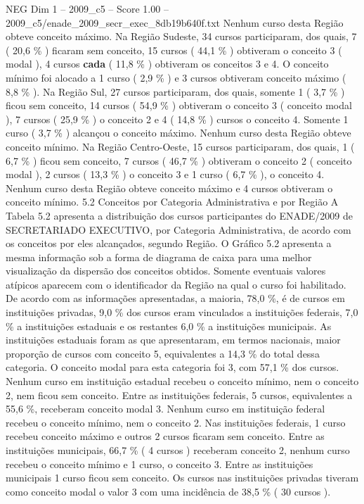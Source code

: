 \begin{textsample}{NEG Dim 1 – 2009\_c5 – Score 1.00 – 2009\_c5/enade\_2009\_secr\_exec\_8db19b640f.txt}
Nenhum curso desta Região obteve conceito máximo.
Na Região Sudeste, 34 cursos participaram, dos quais, 7 ( 20,6 \% ) ficaram sem conceito, 15 cursos ( 44,1 \% ) obtiveram o conceito 3 ( modal ), 4 cursos \textbf{cada} ( 11,8 \% ) obtiveram os conceitos 3 e 4.
O conceito mínimo foi alocado a 1 curso ( 2,9 \% ) e 3 cursos obtiveram conceito máximo ( 8,8 \% ).
Na Região Sul, 27 cursos participaram, dos quais, somente 1 ( 3,7 \% ) ficou sem conceito, 14 cursos ( 54,9 \% ) obtiveram o conceito 3 ( conceito modal ), 7 cursos ( 25,9 \% ) o conceito 2 e 4 ( 14,8 \% ) cursos o conceito 4.
Somente 1 curso ( 3,7 \% ) alcançou o conceito máximo.
Nenhum curso desta Região obteve conceito mínimo.
Na Região Centro-Oeste, 15 cursos participaram, dos quais, 1 ( 6,7 \% ) ficou sem conceito, 7 cursos ( 46,7 \% ) obtiveram o conceito 2 ( conceito modal ), 2 cursos ( 13,3 \% ) o conceito 3 e 1 curso ( 6,7 \% ), o conceito 4.
Nenhum curso desta Região obteve conceito máximo e 4 cursos obtiveram o conceito mínimo. 5.2 Conceitos por Categoria Administrativa e por Região A Tabela 5.2 apresenta a distribuição dos cursos participantes do ENADE/2009 de SECRETARIADO EXECUTIVO, por Categoria Administrativa, de acordo com os conceitos por eles alcançados, segundo Região.
O Gráfico 5.2 apresenta a mesma informação sob a forma de diagrama de caixa para uma melhor visualização da dispersão dos conceitos obtidos.
Somente eventuais valores atípicos aparecem com o identificador da Região na qual o curso foi habilitado.
De acordo com as informações apresentadas, a maioria, 78,0 \%, é de cursos em instituições privadas, 9,0 \% dos cursos eram vinculados a instituições federais, 7,0 \% a instituições estaduais e os restantes 6,0 \% a instituições municipais.
As instituições estaduais foram as que apresentaram, em termos nacionais, maior proporção de cursos com conceito 5, equivalentes a 14,3 \% do total dessa categoria.
O conceito modal para esta categoria foi 3, com 57,1 \% dos cursos.
Nenhum curso em instituição estadual recebeu o conceito mínimo, nem o conceito 2, nem ficou sem conceito.
Entre as instituições federais, 5 cursos, equivalentes a 55,6 \%, receberam conceito modal 3.
Nenhum curso em instituição federal recebeu o conceito mínimo, nem o conceito 2.
Nas instituições federais, 1 curso recebeu conceito máximo e outros 2 cursos ficaram sem conceito.
Entre as instituições municipais, 66,7 \% ( 4 cursos ) receberam conceito 2, nenhum curso recebeu o conceito mínimo e 1 curso, o conceito 3.
Entre as instituições municipais 1 curso ficou sem conceito.
Os cursos nas instituições privadas tiveram como conceito modal o valor 3 com uma incidência de 38,5 \% ( 30 cursos ).

\end{textsample}
